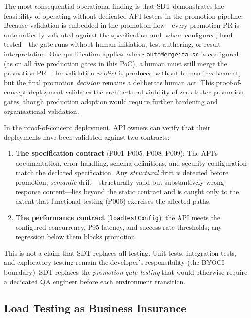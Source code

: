 The most consequential operational finding is that SDT demonstrates the feasibility of operating without dedicated API testers in the promotion pipeline. Because validation is embedded in the promotion flow---every promotion PR is automatically validated against the specification and, where configured, load-tested---the gate runs without human initiation, test authoring, or result interpretation. One qualification applies: where \texttt{autoMerge:false} is configured (as on all five production gates in this PoC), a human must still merge the promotion PR---the validation \emph{verdict} is produced without human involvement, but the final promotion \emph{decision} remains a deliberate human act. This proof-of-concept deployment validates the architectural viability of zero-tester promotion gates, though production adoption would require further hardening and organisational validation.

In the proof-of-concept deployment, API owners can verify that their deployments have been validated against two contracts:

\begin{enumerate}
    \item \textbf{The specification contract} (P001--P005, P008, P009): The API's documentation, error handling, schema definitions, and security configuration match the declared specification. Any \emph{structural} drift is detected before promotion; \emph{semantic} drift---structurally valid but substantively wrong response content---lies beyond the static contract and is caught only to the extent that functional testing (P006) exercises the affected paths.
    \item \textbf{The performance contract} (\texttt{loadTestConfig}): the API meets the configured concurrency, P95 latency, and success-rate thresholds; any regression below them blocks promotion.
\end{enumerate}

This is not a claim that SDT replaces all testing. Unit tests, integration tests, and exploratory testing remain the developer's responsibility (the BYOCI boundary). SDT replaces the \textit{promotion-gate testing} that would otherwise require a dedicated QA engineer before each environment transition.

\subsection{Load Testing as Business Insurance}
\label{subsec:load-testing-insurance}

